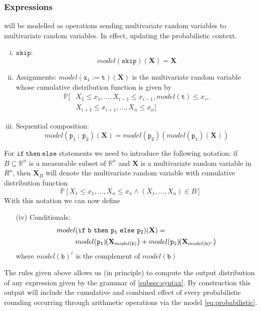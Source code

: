 \documentclass[10pt,conference]{IEEEtran}
\newcommand{\Pro}[1]{\mathbb{P}\left[ #1 \right]}
\newcommand{\R}{\mathbb{R}}
\begin{document}
\subsubsection{Expressions} will be modelled as operations sending multivariate random variables to multivariate random variables. In effect, updating the probabilistic context.

\begin{enumerate}[(i)]
\item $\mathtt{skip}$:
\[
model(\mathtt{skip})(\mathbf{X})=\mathbf{X}
\]
\item Assignments: $model(\mathtt{x_i:=t})(\mathbf{X})$ is the multivariate random variable whose cumulative distribution function is given by
\begin{align*}
\mathbb{P}[&X_1\leq x_1,\ldots,X_{i-1}\leq x_{i-1},model(\mathtt{t})\leq x_i, 
\\
& X_{i+1}\leq x_{i+1},\ldots, X_{n}\leq x_n]
\end{align*}
\item Sequential composition:
\[
model(\mathtt{p_1~;~p_2})(\mathbf{X})=model(\mathtt{p_2})(model(\mathtt{p_1})(\mathbf{X}))
\]
\end{enumerate}

For $\mathtt{if~then~else}$ statements we need to introduce the following notation: if $B\subseteq \R^n$ is a measurable subset of $\R^n$ and $\mathbf{X}$ is a multivariate random variable in $R^n$, then $\mathbf{X}_B$ will denote the multivariate random variable with cumulative distribution function
\[
\Pro{X_1\leq x_1,\ldots,X_n\leq x_n \wedge (X_1,\ldots,X_n)\in B}
\]
With this notation we can now define
\begin{enumerate}
\item[(iv)] Conditionals:
\begin{align*}
 model&(\mathtt{if~b~then~p_1~else~p_2})(\mathbf{X})=
\\
&model(\mathtt{p_1})\hspace{-3pt}\left(\mathbf{X}_{model(\mathtt{b})}\right)+model(\mathtt{p_2})\hspace{-3pt}\left(\mathbf{X}_{model(\mathtt{b})^c}\right)
\end{align*}
where $model(\mathtt{b})^c$ is the complement of $model(\mathtt{b})$
\end{enumerate}

The rules given above allows us (in principle) to compute the output distribution of any expression given by the grammar of \cref{subsec:syntax}. By construction this output will include the cumulative and combined effect of every probabilistic rounding occurring through arithmetic operations via the model \eqref{eq:probabilistic}.
\end{document}
